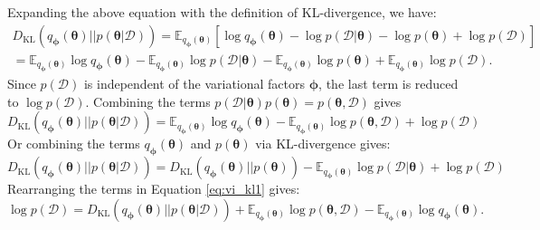 Expanding the above equation with the definition of \ac{KL}-divergence, we have:
\begin{multline}
    D_{\text{KL}}(q_{\boldsymbol{\phi}}(\boldsymbol{\theta}) || p(\boldsymbol{\theta}|\mathcal{D})) = \mathbb{E}_{q_{\boldsymbol{\phi}}(\boldsymbol{\theta})}[\log q_{\boldsymbol{\phi}}(\boldsymbol{\theta}) - \log p(\mathcal{D}|\boldsymbol{\theta}) - \log p(\boldsymbol{\theta}) + \log p(\mathcal{D})]\\
    = \mathbb{E}_{q_{\boldsymbol{\phi}}(\boldsymbol{\theta})}\log q_{\boldsymbol{\phi}}(\boldsymbol{\theta})-\mathbb{E}_{q_{\boldsymbol{\phi}}(\boldsymbol{\theta})}\log p(\mathcal{D}|\boldsymbol{\theta})-\mathbb{E}_{q_{\boldsymbol{\phi}}(\boldsymbol{\theta})}\log p(\boldsymbol{\theta}) + \mathbb{E}_{q_{\boldsymbol{\phi}}(\boldsymbol{\theta})}\log p(\mathcal{D}).
\end{multline}
Since $p(\mathcal{D})$ is independent of the variational factors $\boldsymbol{\phi}$, the last term is reduced to $\log p(\mathcal{D})$.
Combining the terms $p(\mathcal{D}|\boldsymbol{\theta})p(\boldsymbol{\theta})=p(\boldsymbol{\theta}, \mathcal{D})$ gives
\begin{equation}
    \label{eq:vi_kl1}
    D_{\text{KL}}(q_{\boldsymbol{\phi}}(\boldsymbol{\theta}) || p(\boldsymbol{\theta}|\mathcal{D})) = \mathbb{E}_{q_{\boldsymbol{\phi}}(\boldsymbol{\theta})}\log q_{\boldsymbol{\phi}}(\boldsymbol{\theta})-\mathbb{E}_{q_{\boldsymbol{\phi}}(\boldsymbol{\theta})}\log p(\boldsymbol{\theta}, \mathcal{D}) + \log p(\mathcal{D})
\end{equation}
Or combining the terms $q_{\boldsymbol{\phi}}(\boldsymbol{\theta})$ and $p(\boldsymbol{\theta})$ via \ac{KL}-divergence  gives:
\begin{equation}
    \label{eq:vi_kl2}
    D_{\text{KL}}(q_{\boldsymbol{\phi}}(\boldsymbol{\theta}) || p(\boldsymbol{\theta}|\mathcal{D}))=D_{\text{KL}}(q_{\boldsymbol{\phi}}(\boldsymbol{\theta})||p(\boldsymbol{\theta})) - \mathbb{E}_{q_{\boldsymbol{\phi}}(\boldsymbol{\theta})}\log p(\mathcal{D}|\boldsymbol{\theta}) + \log p(\mathcal{D})
\end{equation}
Rearranging the terms in Equation \ref{eq:vi_kl1} gives:
\begin{equation}
    \log p(\mathcal{D}) = D_{\text{KL}}(q_{\boldsymbol{\phi}}(\boldsymbol{\theta}) || p(\boldsymbol{\theta}|\mathcal{D}))+\mathbb{E}_{q_{\boldsymbol{\phi}}(\boldsymbol{\theta})}\log p(\boldsymbol{\theta}, \mathcal{D})-\mathbb{E}_{q_{\boldsymbol{\phi}}(\boldsymbol{\theta})}\log q_{\boldsymbol{\phi}}(\boldsymbol{\theta}).
\end{equation} 

